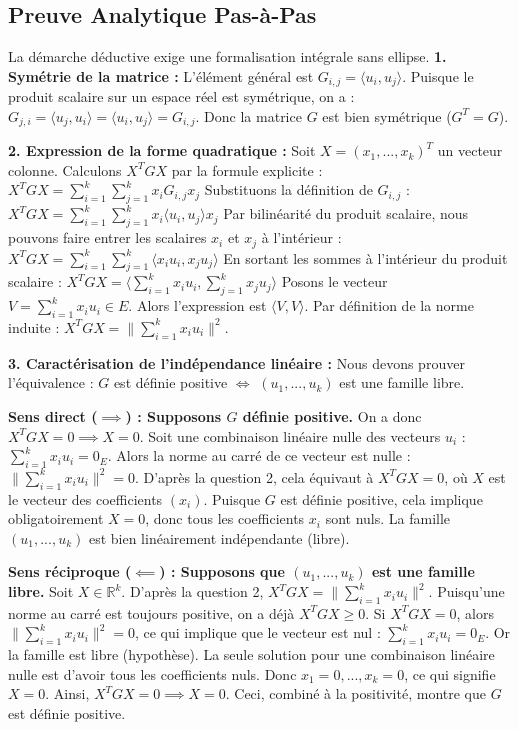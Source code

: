 \documentclass[11pt,a4paper]{report}
\begin{document}
\subsection*{Preuve Analytique Pas-à-Pas}
La démarche déductive exige une formalisation intégrale sans ellipse.
\textbf{1. Symétrie de la matrice :}
L'élément général est $G_{i,j} = \langle u_i, u_j \rangle$.
Puisque le produit scalaire sur un espace réel est symétrique, on a :
$G_{j,i} = \langle u_j, u_i \rangle = \langle u_i, u_j \rangle = G_{i,j}$.
Donc la matrice $G$ est bien symétrique ($G^T = G$).

\textbf{2. Expression de la forme quadratique :}
Soit $X = (x_1, ..., x_k)^T$ un vecteur colonne.
Calculons $X^T G X$ par la formule explicite :
$X^T G X = \sum_{i=1}^k \sum_{j=1}^k x_i G_{i,j} x_j$
Substituons la définition de $G_{i,j}$ :
$X^T G X = \sum_{i=1}^k \sum_{j=1}^k x_i \langle u_i, u_j \rangle x_j$
Par bilinéarité du produit scalaire, nous pouvons faire entrer les scalaires $x_i$ et $x_j$ à l'intérieur :
$X^T G X = \sum_{i=1}^k \sum_{j=1}^k \langle x_i u_i, x_j u_j \rangle$
En sortant les sommes à l'intérieur du produit scalaire :
$X^T G X = \langle \sum_{i=1}^k x_i u_i, \sum_{j=1}^k x_j u_j \rangle$
Posons le vecteur $V = \sum_{i=1}^k x_i u_i \in E$. Alors l'expression est $\langle V, V \rangle$.
Par définition de la norme induite :
$X^T G X = \| \sum_{i=1}^k x_i u_i \|^2$.

\textbf{3. Caractérisation de l'indépendance linéaire :}
Nous devons prouver l'équivalence : $G$ est définie positive $\iff$ $(u_1, ..., u_k)$ est une famille libre.

\textbf{Sens direct ($\implies$) : Supposons $G$ définie positive.}
On a donc $X^T G X = 0 \implies X = 0$.
Soit une combinaison linéaire nulle des vecteurs $u_i$ : $\sum_{i=1}^k x_i u_i = 0_E$.
Alors la norme au carré de ce vecteur est nulle : $\| \sum_{i=1}^k x_i u_i \|^2 = 0$.
D'après la question 2, cela équivaut à $X^T G X = 0$, où $X$ est le vecteur des coefficients $(x_i)$.
Puisque $G$ est définie positive, cela implique obligatoirement $X = 0$, donc tous les coefficients $x_i$ sont nuls.
La famille $(u_1, ..., u_k)$ est bien linéairement indépendante (libre).

\textbf{Sens réciproque ($\impliedby$) : Supposons que $(u_1, ..., u_k)$ est une famille libre.}
Soit $X \in \mathbb{R}^k$. D'après la question 2, $X^T G X = \| \sum_{i=1}^k x_i u_i \|^2$.
Puisqu'une norme au carré est toujours positive, on a déjà $X^T G X \ge 0$.
Si $X^T G X = 0$, alors $\| \sum_{i=1}^k x_i u_i \|^2 = 0$, ce qui implique que le vecteur est nul : $\sum_{i=1}^k x_i u_i = 0_E$.
Or la famille est libre (hypothèse). La seule solution pour une combinaison linéaire nulle est d'avoir tous les coefficients nuls.
Donc $x_1 = 0, ..., x_k = 0$, ce qui signifie $X = 0$.
Ainsi, $X^T G X = 0 \implies X = 0$. Ceci, combiné à la positivité, montre que $G$ est définie positive.
\end{document}
